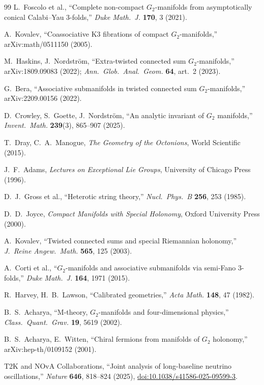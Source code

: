 \begin{thebibliography}{99}
 L.~Foscolo et al., ``Complete non-compact $G_2$-manifolds from asymptotically conical Calabi--Yau 3-folds,'' \textit{Duke Math.\ J.} \textbf{170}, 3 (2021).

 A.~Kovalev, ``Coassociative K3 fibrations of compact $G_2$-manifolds,'' arXiv:math/0511150 (2005).

 M.~Haskins, J.~Nordstr\"om, ``Extra-twisted connected sum $G_2$-manifolds,'' arXiv:1809.09083 (2022); \textit{Ann.\ Glob.\ Anal.\ Geom.} \textbf{64}, art.\ 2 (2023).

 G.~Bera, ``Associative submanifolds in twisted connected sum $G_2$-manifolds,'' arXiv:2209.00156 (2022).

 D.~Crowley, S.~Goette, J.~Nordstr\"om, ``An analytic invariant of $G_2$ manifolds,'' \textit{Invent.\ Math.} \textbf{239}(3), 865--907 (2025).

 T.~Dray, C.~A.~Manogue, \textit{The Geometry of the Octonions}, World Scientific (2015).

 J.~F.~Adams, \textit{Lectures on Exceptional Lie Groups}, University of Chicago Press (1996).

 D.~J.~Gross et al., ``Heterotic string theory,'' \textit{Nucl.\ Phys.\ B} \textbf{256}, 253 (1985).

 D.~D.~Joyce, \textit{Compact Manifolds with Special Holonomy}, Oxford University Press (2000).

 A.~Kovalev, ``Twisted connected sums and special Riemannian holonomy,'' \textit{J.\ Reine Angew.\ Math.} \textbf{565}, 125 (2003).

 A.~Corti et al., ``$G_2$-manifolds and associative submanifolds via semi-Fano 3-folds,'' \textit{Duke Math.\ J.} \textbf{164}, 1971 (2015).

 R.~Harvey, H.~B.~Lawson, ``Calibrated geometries,'' \textit{Acta Math.} \textbf{148}, 47 (1982).

 B.~S.~Acharya, ``M-theory, $G_2$-manifolds and four-dimensional physics,'' \textit{Class.\ Quant.\ Grav.} \textbf{19}, 5619 (2002).

 B.~S.~Acharya, E.~Witten, ``Chiral fermions from manifolds of $G_2$ holonomy,'' arXiv:hep-th/0109152 (2001).

 T2K and NOvA Collaborations, ``Joint analysis of long-baseline neutrino oscillations,'' \textit{Nature} \textbf{646}, 818--824 (2025), \href{https://doi.org/10.1038/s41586-025-09599-3}{doi:10.1038/s41586-025-09599-3}.


\end{thebibliography}
